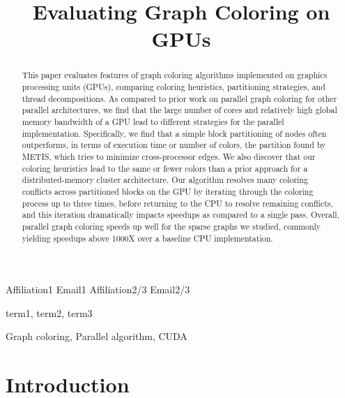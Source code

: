 \documentclass[preprint]{sigplanconf}
\begin{document}
\copyrightdata{[to be supplied]}


\title{Evaluating Graph Coloring on GPUs}

           {Affiliation1}
           {Email1}
           {Affiliation2/3}
           {Email2/3}

\maketitle

\begin{abstract}
This paper evaluates features of graph coloring algorithms implemented on graphics processing units (GPUs), comparing coloring heuristics, partitioning strategies, and thread decompositions.  As compared to prior work on parallel graph coloring for other parallel architectures, we find that the large number of cores and relatively high global memory bandwidth of a GPU lead to different strategies for the parallel implementation.  Specifically, we find that a simple block partitioning of nodes often outperforms, in terms of execution time or number of colors, the partition found by METIS, which tries to minimize cross-processor edges.  We also discover that our coloring heuristics lead to the same or fewer colors than a prior approach for a distributed-memory cluster architecture.  Our algorithm resolves many coloring conflicts across partitioned blocks on the GPU by iterating through the coloring process up to three times, before returning to the CPU to resolve remaining conflicts, and this iteration dramatically impacts speedups as compared to a single pass.  Overall, parallel graph coloring speeds up well for the sparse graphs we studied, commonly yielding speedups above 1000X over a baseline CPU implementation.
\end{abstract}


\terms
term1, term2, term3

\keywords
Graph coloring, Parallel algorithm, CUDA

\section{Introduction}
\end{document}
